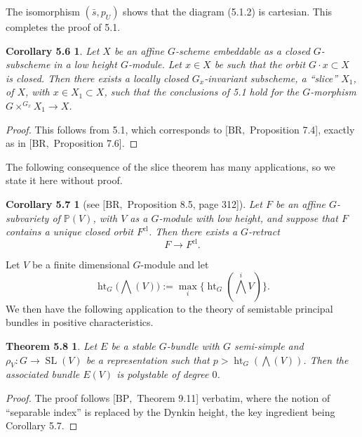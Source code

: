 \documentclass[11pt]{article}
\newcommand{\htG}{\operatorname{ht}_G}
\newcommand{\SL}{\operatorname{SL}}
\newtheorem*{corollary56}{Corollary 5.6}
\newtheorem*{corollary57}{Corollary 5.7}
\newtheorem*{theorem58}{Theorem 5.8}
\begin{document}
The isomorphism \((\bar s,p_U)\) shows that the diagram (5.1.2) is cartesian. This
completes the proof of 5.1.

\begin{corollary56}
Let \(X\) be an affine \(G\)-scheme embeddable as a closed \(G\)-subscheme in a low
height \(G\)-module. Let \(x\in X\) be such that the orbit \(G\cdot x\subset X\) is closed.
Then there exists a locally closed \(G_x\)-invariant subscheme, a ``slice'' \(X_1\), of
\(X\), with \(x\in X_1\subset X\), such that the conclusions of 5.1 hold for the
\(G\)-morphism \(G\times^{G_x}X_1\to X\).
\end{corollary56}

\begin{proof}
This follows from 5.1, which corresponds to \([\mathrm{BR},\) Proposition 7.4], exactly as
in \([\mathrm{BR},\) Proposition 7.6].
\end{proof}

The following consequence of the slice theorem has many applications, so we state it here
without proof.

\begin{corollary57}[{see \([\mathrm{BR},\) Proposition 8.5, page 312]}]
Let \(F\) be an affine \(G\)-subvariety of \(\mathbb P(V)\), with \(V\) as a
\(G\)-module with low height, and suppose that \(F\) contains a unique closed orbit
\(F^{\mathrm{cl}}\). Then there exists a \(G\)-retract
\[
  F\longrightarrow F^{\mathrm{cl}}.
\]
\end{corollary57}

Let \(V\) be a finite dimensional \(G\)-module and let
\begin{equation}
  \htG\bigl(\bigwedge(V)\bigr):=\max_i\{\htG(\bigwedge^i V)\}.
  \tag{5.7.1}
\end{equation}
We then have the following application to the theory of semistable principal bundles in
positive characteristics.

\begin{theorem58}
Let \(E\) be a stable \(G\)-bundle with \(G\) semi-simple and
\(\rho_V:G\to\SL(V)\) be a representation such that
\(p>\htG(\bigwedge(V))\). Then the associated bundle \(E(V)\) is polystable of degree
\(0\).
\end{theorem58}

\begin{proof}
The proof follows \([\mathrm{BP},\) Theorem 9.11] verbatim, where the notion of
``separable index'' is replaced by the Dynkin height, the key ingredient being Corollary
5.7.
\end{proof}
\end{document}
